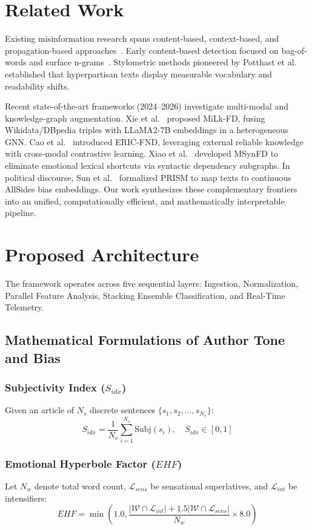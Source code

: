 \documentclass[conference]{IEEEtran}
\begin{document}
\section{Related Work}
Existing misinformation research spans content-based, context-based, and propagation-based approaches~\cite{shu2017fake}. Early content-based detection focused on bag-of-words and surface n-grams~\cite{ahmed2018detecting, rashkin2017truth}. Stylometric methods pioneered by Potthast et al.~\cite{potthast2017stylometric} established that hyperpartisan texts display measurable vocabulary and readability shifts.

Recent state-of-the-art frameworks (2024--2026) investigate multi-modal and knowledge-graph augmentation. Xie et al.~\cite{xie2025milk} proposed MiLk-FD, fusing Wikidata/DBpedia triples with LLaMA2-7B embeddings in a heterogeneous GNN. Cao et al.~\cite{cao2025eric} introduced ERIC-FND, leveraging external reliable knowledge with cross-modal contrastive learning. Xiao et al.~\cite{xiao2024msynfd} developed MSynFD to eliminate emotional lexical shortcuts via syntactic dependency subgraphs. In political discourse, Sun et al.~\cite{sun2025prism} formalized PRISM to map texts to continuous AllSides bias embeddings. Our work synthesizes these complementary frontiers into an unified, computationally efficient, and mathematically interpretable pipeline.

\section{Proposed Architecture}
The framework operates across five sequential layers: Ingestion, Normalization, Parallel Feature Analysis, Stacking Ensemble Classification, and Real-Time Telemetry.

\subsection{Mathematical Formulations of Author Tone and Bias}
\subsubsection{Subjectivity Index ($S_{idx}$)}
Given an article of $N_s$ discrete sentences $\{s_1, s_2, \dots, s_{N_s}\}$:
\begin{equation}
S_{idx} = \frac{1}{N_s} \sum_{i=1}^{N_s} \text{Subj}(s_i), \quad S_{idx} \in [0, 1]
\end{equation}

\subsubsection{Emotional Hyperbole Factor ($EHF$)}
Let $N_w$ denote total word count, $\mathcal{L}_{sens}$ be sensational superlatives, and $\mathcal{L}_{int}$ be intensifiers:
\begin{equation}
EHF = \min\left(1.0, \frac{|\mathcal{W} \cap \mathcal{L}_{int}| + 1.5 |\mathcal{W} \cap \mathcal{L}_{sens}|}{N_w} \times 8.0\right)
\end{equation}
\end{document}
